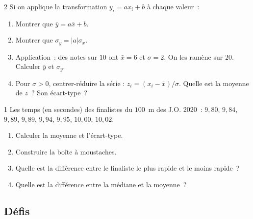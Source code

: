 \begin{probleme}{2}
Si on applique la transformation $y_i = ax_i + b$ \`a chaque valeur~:
\begin{enumerate}
  \item Montrer que $\bar{y} = a\bar{x} + b$.
  \item Montrer que $\sigma_y = |a|\sigma_x$.
  \item Application~: des notes sur $10$ ont $\bar{x}=6$ et $\sigma=2$.
        On les ramène sur $20$. Calculer $\bar{y}$ et $\sigma_y$.
  \item Pour $\sigma>0$, centrer-r\'eduire la s\'erie : $z_i=(x_i-\bar{x})/\sigma$.
        Quelle est la moyenne de $z$~? Son \'ecart-type~?
\end{enumerate}
\end{probleme}

\begin{probleme}{1}
Les temps (en secondes) des finalistes du $100$~m des J.O. 2020~:
$9{,}80$, $9{,}84$, $9{,}89$, $9{,}89$, $9{,}94$, $9{,}95$, $10{,}00$, $10{,}02$.
\begin{enumerate}
  \item Calculer la moyenne et l'\'ecart-type.
  \item Construire la bo\^ite \`a moustaches.
  \item Quelle est la diff\'erence entre le finaliste le plus rapide
        et le moins rapide~?
  \item Quelle est la diff\'erence entre la m\'ediane et la moyenne~?
\end{enumerate}
\end{probleme}

\subsection*{D\'efis}

